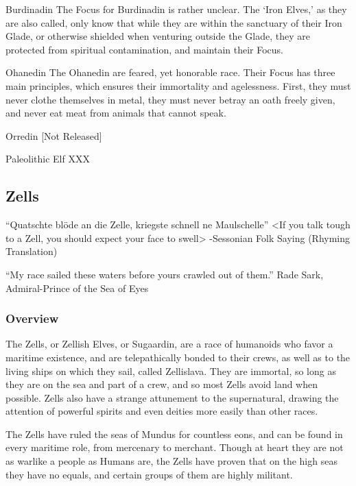 \documentclass[oneside,11pt,english]{book}
\begin{document}
 


Burdinadin 
The Focus for Burdinadin is rather unclear. The ‘Iron Elves,’ as they are also called, only know that while 
they are within the sanctuary of their Iron Glade, or otherwise shielded when venturing outside the Glade, 
they are protected from spiritual contamination, and maintain their Focus. 

 

Ohanedin 
The Ohanedin are feared, yet honorable race. Their Focus has three main principles, which ensures their 
immortality and agelessness. First, they must never clothe themselves in metal, they must never betray an 
oath freely given, and never eat meat from animals that cannot speak. 

 

Orredin 
[Not Released] 

 

Paleolithic Elf 
XXX 

 

\subsection{Zells}
“Quatschte blöde an die Zelle, kriegste schnell ne Maulschelle” 
<If you talk tough to a Zell, you should expect your face to swell> 
-Sessonian Folk Saying (Rhyming Translation) 
 
“My race sailed these waters before yours crawled out of them.” 
Rade Sark, Admiral-Prince of the Sea of Eyes 
 
\subsubsection*{Overview} 
The Zells, or Zellish Elves, or Sugaardin, are a race of humanoids who favor a maritime existence, and 
are telepathically bonded to their crews, as well as to the living ships on which they sail, called Zellislava. 
They are immortal, so long as they are on the sea and part of a crew, and so most Zells avoid land when 
possible. Zells also have a strange attunement to the supernatural, drawing the attention of powerful 
spirits and even deities more easily than other races. 

 

The Zells have ruled the seas of Mundus for countless eons, and can be found in every maritime role, 
from mercenary to merchant. Though at heart they are not as warlike a people as Humans are, the Zells 
have proven that on the high seas they have no equals, and certain groups of them are highly militant. 
\end{document}
